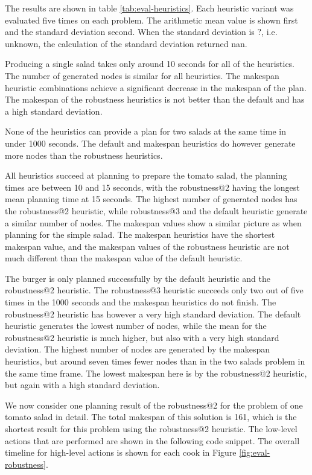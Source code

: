 The results are shown in table \ref{tab:eval-heuristics}.
Each heuristic variant was evaluated five times on each problem.
The arithmetic mean value is shown first and the standard deviation second.
When the standard deviation is $?$, i.e. unknown, the calculation of the standard deviation returned nan.

Producing a single salad takes only around 10 seconds for all of the heuristics.
The number of generated nodes is similar for all heuristics.
The makespan heuristic combinations achieve a significant decrease in the makespan of the plan.
The makespan of the robustness heuristics is not better than the default and has a high standard deviation.

None of the heuristics can provide a plan for two salads at the same time in under 1000 seconds.
The default and makespan heuristics do however generate more nodes than the robustness heuristics.

All heuristics succeed at planning to prepare the tomato salad, the planning times are between 10 and 15 seconds, with the robustness@2 having the longest mean planning time at 15 seconds.
The highest number of generated nodes has the robustness@2 heuristic, while robustness@3 and the default heuristic generate a similar number of nodes.
The makespan values show a similar picture as when planning for the simple salad.
The makespan heuristics have the shortest makespan value, and the makespan values of the robustness heuristic are not much different than the makespan value of the default heuristic.

The burger is only planned successfully by the default heuristic and the robustness@2 heuristic.
The robustness@3 heuristic succeeds only two out of five times in the 1000 seconds and the makespan heuristics do not finish.
The robustness@2 heuristic has however a very high standard deviation.
The default heuristic generates the lowest number of nodes, while the mean for the robustness@2 heuristic is much higher, but also with a very high standard deviation.
The highest number of nodes are generated by the makespan heuristics, but around seven times fewer nodes than in the two salads problem in the same time frame.
The lowest makespan here is by the robustness@2 heuristic, but again with a high standard deviation.

We now consider one planning result of the robustness@2 for the problem of one tomato salad in detail.
The total makespan of this solution is 161, which is the shortest result for this problem using the robustness@2 heuristic.
The low-level actions that are performed are shown in the following code snippet.
The overall timeline for high-level actions is shown for each cook in Figure \ref{fig:eval-robustness}.

